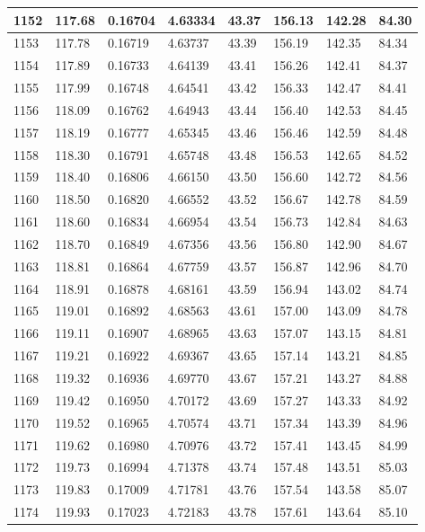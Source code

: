 \documentclass[12pt,a4paper,twoside]{article}
\begin{document}
\begin{center}
\begin{longtable}{l l l l | l l l l}
1152 & 117.68 & 0.16704 & 4.63334 & 43.37 & 156.13 & 142.28 & 84.30 \\ \hline
1153 & 117.78 & 0.16719 & 4.63737 & 43.39 & 156.19 & 142.35 & 84.34 \\ \hline
1154 & 117.89 & 0.16733 & 4.64139 & 43.41 & 156.26 & 142.41 & 84.37 \\ \hline
1155 & 117.99 & 0.16748 & 4.64541 & 43.42 & 156.33 & 142.47 & 84.41 \\ \hline
1156 & 118.09 & 0.16762 & 4.64943 & 43.44 & 156.40 & 142.53 & 84.45 \\ \hline
1157 & 118.19 & 0.16777 & 4.65345 & 43.46 & 156.46 & 142.59 & 84.48 \\ \hline
1158 & 118.30 & 0.16791 & 4.65748 & 43.48 & 156.53 & 142.65 & 84.52 \\ \hline
1159 & 118.40 & 0.16806 & 4.66150 & 43.50 & 156.60 & 142.72 & 84.56 \\ \hline
1160 & 118.50 & 0.16820 & 4.66552 & 43.52 & 156.67 & 142.78 & 84.59 \\ \hline
1161 & 118.60 & 0.16834 & 4.66954 & 43.54 & 156.73 & 142.84 & 84.63 \\ \hline
1162 & 118.70 & 0.16849 & 4.67356 & 43.56 & 156.80 & 142.90 & 84.67 \\ \hline
1163 & 118.81 & 0.16864 & 4.67759 & 43.57 & 156.87 & 142.96 & 84.70 \\ \hline
1164 & 118.91 & 0.16878 & 4.68161 & 43.59 & 156.94 & 143.02 & 84.74 \\ \hline
1165 & 119.01 & 0.16892 & 4.68563 & 43.61 & 157.00 & 143.09 & 84.78 \\ \hline
1166 & 119.11 & 0.16907 & 4.68965 & 43.63 & 157.07 & 143.15 & 84.81 \\ \hline
1167 & 119.21 & 0.16922 & 4.69367 & 43.65 & 157.14 & 143.21 & 84.85 \\ \hline
1168 & 119.32 & 0.16936 & 4.69770 & 43.67 & 157.21 & 143.27 & 84.88 \\ \hline
1169 & 119.42 & 0.16950 & 4.70172 & 43.69 & 157.27 & 143.33 & 84.92 \\ \hline
1170 & 119.52 & 0.16965 & 4.70574 & 43.71 & 157.34 & 143.39 & 84.96 \\ \hline
1171 & 119.62 & 0.16980 & 4.70976 & 43.72 & 157.41 & 143.45 & 84.99 \\ \hline
1172 & 119.73 & 0.16994 & 4.71378 & 43.74 & 157.48 & 143.51 & 85.03 \\ \hline
1173 & 119.83 & 0.17009 & 4.71781 & 43.76 & 157.54 & 143.58 & 85.07 \\ \hline
1174 & 119.93 & 0.17023 & 4.72183 & 43.78 & 157.61 & 143.64 & 85.10 \\ \hline

\end{longtable}
\end{center}
\end{document}

